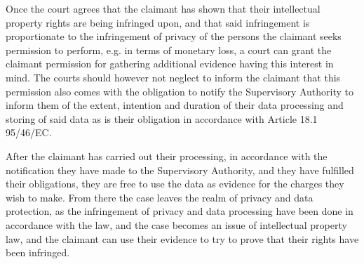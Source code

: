 Once the court agrees that the claimant has shown that their intellectual property rights are being infringed upon, and that said infringement is proportionate to the infringement of privacy of the persons the claimant seeks permission to perform, e.g. in terms of monetary loss, a court can grant the claimant permission for gathering additional evidence having this interest in mind.
The courts should however not neglect to inform the claimant that this permission also comes with the obligation to notify the Supervisory Authority to inform them of the extent, intention and duration of their data processing and storing of said data as is their obligation in accordance with Article 18.1 95/46/EC.

After the claimant has carried out their processing, in accordance with the notification they have made to the Supervisory Authority, and they have fulfilled their obligations, they are free to use the data as evidence for the charges they wish to make.
From there the case leaves the realm of privacy and data protection, as the infringement of privacy and data processing have been done in accordance with the law, and the case becomes an issue of intellectual property law, and the claimant can use their evidence to try to prove that their rights have been infringed.
